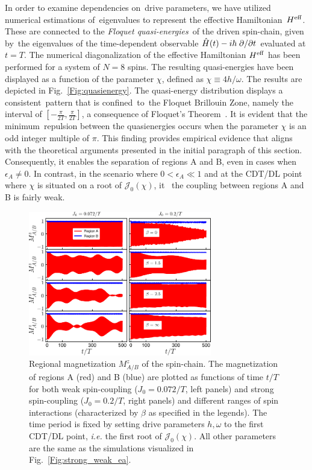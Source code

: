 \documentclass[%
nofootinbib,
reprint,
superscriptaddress,
amsmath,amssymb,showkeys,
aps,
prb,
]{revtex4-2}
\begin{document}
In order to examine dependencies on drive parameters, we have utilized numerical estimations of eigenvalues to represent the effective Hamiltonian $H^{\rm eff}$. These are connected to the \textit{Floquet quasi-energies} of the driven spin-chain, given by the eigenvalues of the time-dependent observable $\hat{H}(t)-i\hbar\pdv*{}{t}$ evaluated at $t=T$. The numerical diagonalization of the effective Hamiltonian $H^{\rm eff}$ has been performed for a system of $N=8$ spins. The resulting quasi-energies have been displayed as a function of the parameter $\chi$, defined as $\chi\equiv 4h/\omega$. The results are depicted in Fig.~\ref{Fig:quasienergy}. The quasi-energy distribution displays a consistent pattern that is confined to the Floquet Brillouin Zone, namely the interval of $[-\frac{\pi}{2T}, \frac{\pi}{2T}]$, a consequence of Floquet's Theorem~\cite{dutta2014}. It is evident that the minimum repulsion between the quasienergies occurs when the parameter $\chi$ is an odd integer multiple of $\pi$. This finding provides empirical evidence that aligns with the theoretical arguments presented in the initial paragraph of this section. Consequently, it enables the separation of regions A and B, even in cases when $\epsilon_A \neq 0$. In contrast, in the scenario where $0 < \epsilon_A \ll 1 $ and at the CDT/DL point where $\chi$ is situated on a root of $\mathcal{J}_0(\chi)$, it  the coupling between regions A and B is fairly weak.
\begin{figure}
	\centering
	\includegraphics[width = 8cm]{clean_J_strong_MzAB_betas.pdf}
	\caption{Regional magnetization $M^z_{A/B}$ of the spin-chain. The magnetization of regions A (red) and B (blue) are plotted  as functions of time $t/T$ for both weak spin-coupling ($J_0=0.072/T$, left panels) and strong spin-coupling ($J_0=0.2/T$, right panels) and different ranges of spin interactions (characterized by $\beta$ as specified in the legends). The time period is fixed by setting drive parameters $h,\omega$ to the first CDT/DL point, \textit{i.e.} the first root of $\mathcal{J}_0(\chi)$. All other parameters are the same as the simulations visualized in Fig.~\ref{Fig:strong_weak_ea}.}
	\label{Fig:regiogionalmag}
\end{figure} 
\end{document}
